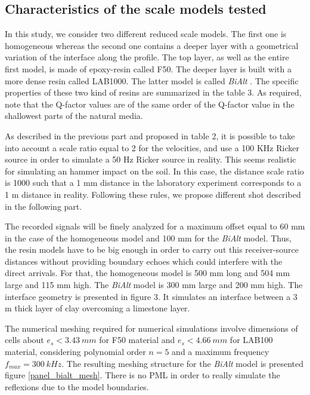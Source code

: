 \documentclass[manuscript,revised]{geophysics}
\newcommand{\bialt}{\textit{BiAlt} }
\begin{document}
\subsection{Characteristics of the scale models tested}

\noindent In this study, we consider two different reduced scale models. The first one is homogeneous whereas the second one contains a deeper layer with a geometrical variation of the interface along the profile. The top layer, as well as the entire first model, is made of epoxy-resin called F50. The deeper layer is built with a more dense resin called LAB1000. The latter model is called \bialt. The specific properties of these two kind of resins are summarized in the table 3. As required, note that the Q-factor values are of the same order of the Q-factor value in the shallowest parts of the natural media.

\noindent As described in the previous part and proposed in table 2, it is possible to take into account a scale ratio equal to 2 for the velocities, and use a 100 KHz Ricker source in order to simulate a 50 Hz Ricker source in reality. This seems realistic for simulating an hammer impact on the soil. In this case, the distance scale ratio is 1000 such that a 1 mm distance in the laboratory experiment corresponds to a 1 m distance in reality. Following these rules, we propose different shot described in the following part. 

\noindent The recorded signals will be finely analyzed for a maximum offset equal to 60 mm in the case of the homogeneous model and 100 mm for the \bialt model. Thus, the resin models have to be big enough in order to carry out this receiver-source distances without providing boundary echoes which could interfere with the direct arrivals. For that, the homogeneous model is 500 mm long and 504 mm large and 115 mm high. The \bialt model is 300 mm large and 200 mm high. The interface geometry is presented in figure 3. It simulates an interface between a 3 m thick layer of clay overcoming a limestone layer.

\noindent The numerical meshing required for numerical simulations involve dimensions of cells about $e_{s}<3.43\ mm$ for F50 material and $e_{s}<4.66\ mm$ for LAB100 material, considering polynomial order $n=5$ and a maximum frequency $f_{max}=300\ kHz$. The resulting meshing structure for the \bialt model is presented figure \ref{panel_bialt_mesh}.
There is no PML in order to really simulate the reflexions due to the model boundaries.
\end{document}
